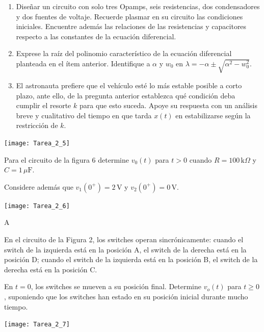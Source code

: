 \documentclass[
  11pt,
  letterpaper,
   addpoints,
  ]{exam}
\begin{document}
\begin{questions}
\begin{enumerate}
    \item Diseñar un circuito con solo tres Opamps, seis resistencias, dos condensadores y dos fuentes de voltaje. Recuerde plasmar en su circuito las condiciones iniciales. Encuentre además las relaciones de las resistencias y capacitores respecto a las constantes de la ecuación diferencial.
    
    \item Exprese la raíz del polinomio característico de la ecuación diferencial planteada en el ítem anterior. Identifique a \( \alpha \) y \( w_0 \) en \( \lambda = -\alpha \pm \sqrt{\alpha^2 - w_0^2} \).
    
    \item El astronauta prefiere que el vehículo esté lo más estable posible a corto plazo, ante ello, de la pregunta anterior establezca qué condición deba cumplir el resorte \( k \) para que esto suceda. Apoye su respuesta con un análisis breve y cualitativo del tiempo en que tarda \( x(t) \) en estabilizarse según la restricción de \( k \).
\end{enumerate}
\begin{center}
    \texttt{[image: Tarea\_2\_5]}
\end{center}
\question Para el circuito de la figura 6 determine \( v_0(t) \) para \( t > 0 \) cuando \( R = 100 \, \text{k}\Omega \) y \( C = 1 \, \mu\text{F} \).

Considere además que \( v_1(0^+) = 2 \, \text{V} \) y \( v_2(0^+) = 0 \, \text{V} \).

\begin{center}
    \texttt{[image: Tarea\_2\_6]}
\end{center}
\begin{solution}
   A
\end{solution}

\question En el circuito de la Figura 2, los switches operan sincrónicamente: cuando el switch de la izquierda está en la posición A, el switch de la derecha está en la posición D; cuando el switch de la izquierda está en la posición B, el switch de la derecha está en la posición C.

En \( t = 0 \), los switches se mueven a su posición final. Determine \( v_o(t) \) para \( t \geq 0 \), suponiendo que los switches han estado en su posición inicial durante mucho tiempo.

\begin{center}
    \texttt{[image: Tarea\_2\_7]}
\end{center}
\end{questions}
\end{document}
